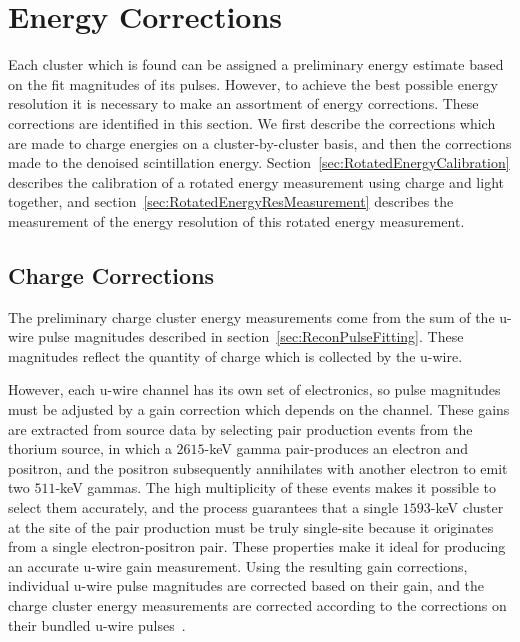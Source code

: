 \section{Energy Corrections}\label{sec:ResultEnergy}

Each cluster which is found can be assigned a preliminary energy estimate based on the fit magnitudes of its pulses.  However, to achieve the best possible energy resolution it is necessary to make an assortment of energy corrections.  These corrections are identified in this section.  We first describe the corrections which are made to charge energies on a cluster-by-cluster basis, and then the corrections made to the denoised scintillation energy.  Section~\ref{sec:RotatedEnergyCalibration} describes the calibration of a rotated energy measurement using charge and light together, and section~\ref{sec:RotatedEnergyResMeasurement} describes the measurement of the energy resolution of this rotated energy measurement.

\subsection{Charge Corrections}\label{sec:ResultEnergyCharge}

The preliminary charge cluster energy measurements come from the sum of the u-wire pulse magnitudes described in section~\ref{sec:ReconPulseFitting}.  These magnitudes reflect the quantity of charge which is collected by the u-wire.

However, each u-wire channel has its own set of electronics, so pulse magnitudes must be adjusted by a gain correction which depends on the channel.  These gains are extracted from source data by selecting pair production events from the thorium source, in which a $2615$-keV gamma pair-produces an electron and positron, and the positron subsequently annihilates with another electron to emit two $511$-keV gammas.  The high multiplicity of these events makes it possible to select them accurately, and the process guarantees that a single $1593$-keV cluster at the site of the pair production must be truly single-site because it originates from a single electron-positron pair.  These properties make it ideal for producing an accurate u-wire gain measurement.  Using the resulting gain corrections, individual u-wire pulse magnitudes are corrected based on their gain, and the charge cluster energy measurements are corrected according to the corrections on their bundled u-wire pulses~\cite{EnergyDocumentRun2a}.

